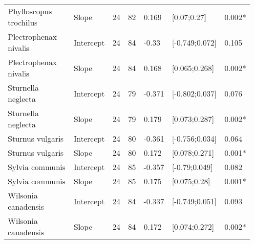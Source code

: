 \documentclass{article}
\begin{document}
\begin{table}[H]
\begin{tabular}{llrrlll}
  Phylloscopus trochilus & Slope &  24 &  82 & 0.169 & [0.07;0.27] & 0.002* \\ 
  Plectrophenax nivalis & Intercept &  24 &  84 & -0.33 & [-0.749;0.072] & 0.105 \\ 
  Plectrophenax nivalis & Slope &  24 &  84 & 0.168 & [0.065;0.268] & 0.002* \\ 
  Sturnella neglecta & Intercept &  24 &  79 & -0.371 & [-0.802;0.037] & 0.076 \\ 
  Sturnella neglecta & Slope &  24 &  79 & 0.179 & [0.073;0.287] & 0.002* \\ 
  Sturnus vulgaris & Intercept &  24 &  80 & -0.361 & [-0.756;0.034] & 0.064 \\ 
  Sturnus vulgaris & Slope &  24 &  80 & 0.172 & [0.078;0.271] & 0.001* \\ 
  Sylvia communis & Intercept &  24 &  85 & -0.357 & [-0.79;0.049] & 0.082 \\ 
  Sylvia communis & Slope &  24 &  85 & 0.175 & [0.075;0.28] & 0.001* \\ 
  Wilsonia canadensis & Intercept &  24 &  84 & -0.337 & [-0.749;0.051] & 0.093 \\ 
  Wilsonia canadensis & Slope &  24 &  84 & 0.172 & [0.074;0.272] & 0.002* \\ 
  \hline
  \end{tabular}
  \end{table}
  
  
  
\end{document}
